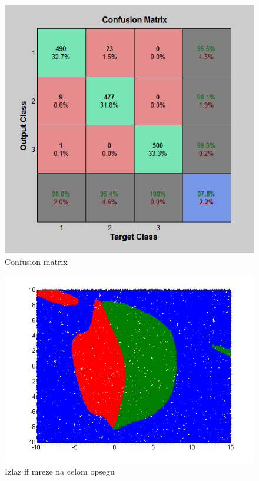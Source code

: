\documentclass{report}
\begin{document}
\begin{enumerate}
\begin{enumerate}
\begin{figure}[!h]
\begin{center}
\includegraphics[scale=0.7]{B1confussionFF3.png}
\caption{Confusion matrix}
\end{center}
\end{figure}

\begin{figure}[!h]
\begin{center}
\includegraphics[scale=0.8]{B1outputFF3Random50000.png}
\caption{Izlaz ff mreze na celom opsegu}
\end{center}
\end{figure}











\end{enumerate}
\end{enumerate}
\end{document}
